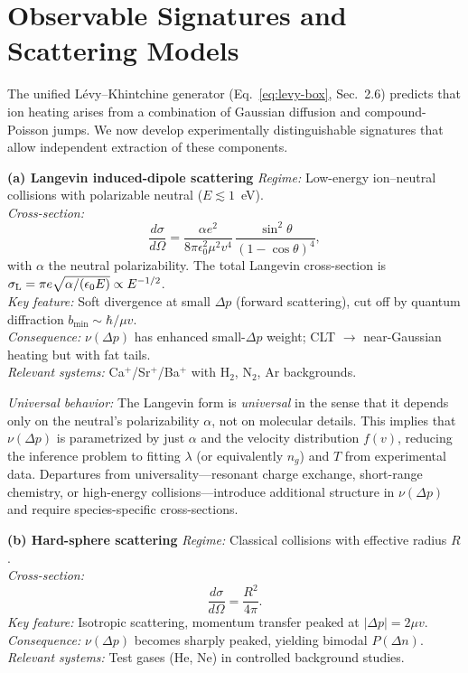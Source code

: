 \section{Observable Signatures and Scattering Models}
The unified L\'evy--Khintchine generator (Eq.~\ref{eq:levy-box}, Sec.~2.6) predicts 
that ion heating arises from a combination of Gaussian diffusion and compound-Poisson jumps. 
We now develop experimentally distinguishable signatures that allow independent extraction of these components.

\noindent\textbf{(a) Langevin induced-dipole scattering}\quad
\emph{Regime:} Low-energy ion--neutral collisions with polarizable neutral ($E \lesssim 1$~eV).\\
\emph{Cross-section:}
\[
\frac{d\sigma}{d\Omega} = 
\frac{\alpha e^2}{8\pi\epsilon_0^2 \mu^2 v^4}\,
\frac{\sin^2\theta}{(1-\cos\theta)^4},
\]
with $\alpha$ the neutral polarizability. The total Langevin cross-section is 
$\sigma_{\rm L} = \pi e\sqrt{\alpha/(\epsilon_0 E)} \propto E^{-1/2}$.\\
\emph{Key feature:} Soft divergence at small $\Delta p$ (forward scattering), cut off by quantum diffraction $b_{\min}\sim \hbar/\mu v$.\\
\emph{Consequence:} $\nu(\Delta p)$ has enhanced small-$\Delta p$ weight; CLT $\to$ near-Gaussian heating but with fat tails.\\
\emph{Relevant systems:} Ca$^+$/Sr$^+$/Ba$^+$ with H$_2$, N$_2$, Ar backgrounds.

\textit{Universal behavior:} 
The Langevin form is \emph{universal} in the sense that it depends only on the neutral's polarizability $\alpha$, not on molecular details. 
This implies that $\nu(\Delta p)$ is parametrized by just $\alpha$ and the velocity distribution $f(v)$, reducing the inference problem to fitting $\lambda$ (or equivalently $n_g$) and $T$ from experimental data.
Departures from universality—resonant charge exchange, short-range chemistry, or high-energy collisions—introduce additional structure in $\nu(\Delta p)$ and require species-specific cross-sections.

\medskip
\noindent\textbf{(b) Hard-sphere scattering}\quad
\emph{Regime:} Classical collisions with effective radius $R$.\\
\emph{Cross-section:}
\[
\frac{d\sigma}{d\Omega} = \frac{R^2}{4\pi}.
\]
\emph{Key feature:} Isotropic scattering, momentum transfer peaked at $|\Delta p|=2\mu v$.\\
\emph{Consequence:} $\nu(\Delta p)$ becomes sharply peaked, yielding bimodal $P(\Delta n)$.\\
\emph{Relevant systems:} Test gases (He, Ne) in controlled background studies.

